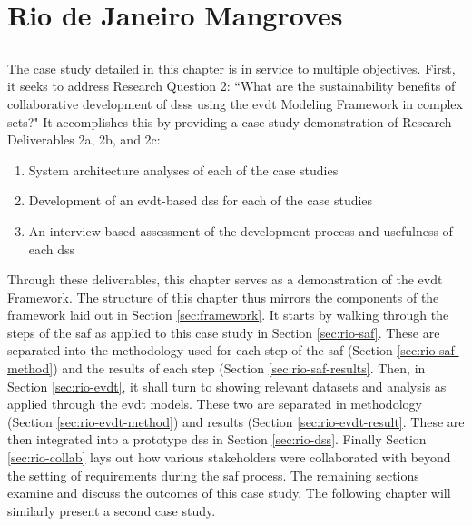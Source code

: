 \chapter{Rio de Janeiro Mangroves} \label{ch:mangroves}

\section{}

The case study detailed in this chapter is in service to multiple objectives. First, it seeks to address Research Question 2: ``What are the sustainability benefits of collaborative development of \acp{dss} using the \acf{evdt} Modeling Framework in complex \acf{sets}?" It accomplishes this by providing a case study demonstration of Research Deliverables 2a, 2b, and 2c: 

	\begin{enumerate}[label=\emph{\alph*},itemsep=0pt,parsep=0pt]
		\item{System architecture analyses of each of the case studies} 
		\item{Development of an \ac{evdt}-based \acf{dss} for each of the case studies} 
		\item{An interview-based assessment of the development process and usefulness of each \ac{dss}} 
	\end{enumerate}
	
Through these deliverables, this chapter serves as a demonstration of the \ac{evdt} Framework. The structure of this chapter thus mirrors the components of the framework laid out in Section \ref{sec:framework}. It starts by walking through the steps of the \acf{saf} as applied to this case study in Section \ref{sec:rio-saf}. These are separated into the methodology used for each step of the \ac{saf} (Section \ref{sec:rio-saf-method}) and the results of each step (Section \ref{sec:rio-saf-results}. Then, in Section \ref{sec:rio-evdt}, it shall turn to showing relevant datasets and analysis as applied through the \acf{evdt} models. These two are separated in methodology (Section \ref{sec:rio-evdt-method}) and results (Section \ref{sec:rio-evdt-result}. These are then integrated into a prototype \ac{dss} in Section \ref{sec:rio-dss}. Finally Section \ref{sec:rio-collab} lays out how various stakeholders were collaborated with beyond the setting of requirements during the \ac{saf} process. The remaining sections examine and discuss the outcomes of this case study. The following chapter will similarly present a second case study.  


